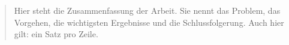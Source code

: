 
\pagestyle{empty}

\renewcommand{\abstractname}{Abstract}
\begin{abstract}
Hier steht die Zusammenfassung der Arbeit.
Sie nennt das Problem, das Vorgehen, die wichtigsten Ergebnisse und die Schlussfolgerung.
Auch hier gilt: ein Satz pro Zeile.
\end{abstract}
